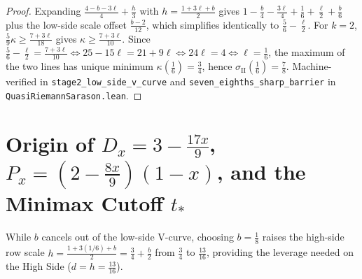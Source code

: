 \documentclass[11pt]{amsart}
\theoremstyle{definition}
\theoremstyle{remark}
\begin{document}
\begin{proof}
Expanding $\frac{4 - b - 3\ell}{4} + \frac{h}{3}$ with $h = \frac{1 + 3\ell + b}{2}$ gives $1 - \frac{b}{4} - \frac{3\ell}{4} + \frac{1}{6} + \frac{\ell}{2} + \frac{b}{6}$ plus the low-side scale offset $\frac{b - 2}{12}$, which simplifies identically to $\frac{5}{6} - \frac{\ell}{2}$. For $k = 2$, $\frac{5}{9}\kappa \ge \frac{7 + 3\ell}{18}$ gives $\kappa \ge \frac{7 + 3\ell}{10}$. Since $\frac{5}{6} - \frac{\ell}{2} = \frac{7 + 3\ell}{10} \iff 25 - 15\ell = 21 + 9\ell \iff 24\ell = 4 \iff \ell = \frac{1}{6}$, the maximum of the two lines has unique minimum $\kappa(\frac{1}{6}) = \frac{3}{4}$, hence $\sigma_{\mathrm{II}}(\frac{1}{6}) = \frac{7}{8}$. Machine-verified in \texttt{stage2\_low\_side\_v\_curve} and \texttt{seven\_eighths\_sharp\_barrier} in \texttt{QuasiRiemannSarason.lean}.
\end{proof}

\section{Origin of $D_x = 3 - \frac{17x}{9}$, $P_x = (2 - \frac{8x}{9})(1 - x)$, and the Minimax Cutoff $t_*$}

While $b$ cancels out of the low-side V-curve, choosing $b = \frac{1}{8}$ raises the high-side row scale $h = \frac{1 + 3(1/6) + b}{2} = \frac{3}{4} + \frac{b}{2}$ from $\frac{3}{4}$ to $\frac{13}{16}$, providing the leverage needed on the High Side ($d = h = \frac{13}{16}$).
\end{document}
